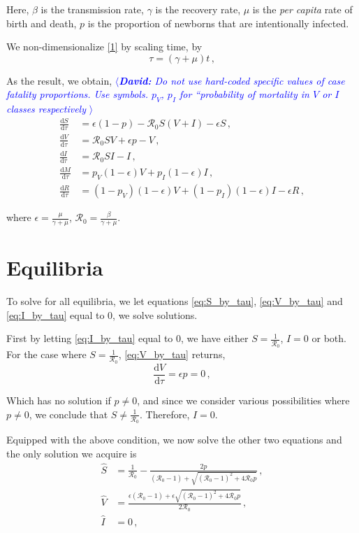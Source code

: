 \documentclass[12pt]{article}
\newcommand\dbyd[2]{\frac{\mathrm d{#1}}{\mathrm d{#2}}}
\newcommand{\R}{\mathcal{R}}
\newcommand{\david}[1]{\textcolor{blue}{$\langle${\slshape{\bfseries David:} #1 }$\rangle$}}
\newcommand{\pmV}{p_{V}}
\newcommand{\pmI}{p_{I}}
\begin{document}
Here, $\beta$ is the transmission rate, $\gamma$ is the recovery rate,
$\mu$ is the \emph{per capita} rate of birth and death, $p$ is the
proportion of newborns that are intentionally infected.

We non-dimensionalize \autoref{1} by scaling time, by
\begin{equation}
\tau=(\gamma+\mu)t \,,
\end{equation}

As the result, we obtain,
\david{Do not use hard-coded specific values of case fatality
  proportions.  Use symbols. $\pmV$, $\pmI$ for ``probability of
  mortality in $V$ or $I$ classes respectively}
\begin{subequations}\label{eq:base_ODE}
\begin{align}
\dbyd{S}{\tau}&=\epsilon(1-p)- \R_0 S(V+I)-\epsilon S\,, \label{eq:S_by_tau}\\
\dbyd{V}{\tau}&=\R_0 SV+\epsilon p-V\,, \label{eq:V_by_tau}\\
\dbyd{I}{\tau}&=\R_0 SI-I\,, \label{eq:I_by_tau}\\
\dbyd{M}{\tau}&=\pmV(1-\epsilon) V+\pmI(1-\epsilon) I\,,\\
\dbyd{R}{\tau}&=(1-\pmV)(1-\epsilon) V+(1-\pmI)(1-\epsilon) I-\epsilon R\,,
\end{align}
\end{subequations}

where $\epsilon=\frac{\mu}{\gamma+\mu}$, $\R_0=\frac{\beta}{\gamma+\mu}$.

\section{Equilibria}

To solve for all equilibria, we let equations \autoref{eq:S_by_tau}, \autoref{eq:V_by_tau} and \autoref{eq:I_by_tau} equal to 0, we solve solutions.

First by letting \autoref{eq:I_by_tau} equal to 0, we have either $S=\frac{1}{\R_0}$, $I=0$ or both. For the case where $S=\frac{1}{\R_0}$, \autoref{eq:V_by_tau} returns,
\begin{equation}
\dbyd{V}{\tau}=\epsilon p =0\,,
\end{equation}

Which has no solution if $p\neq 0$, and since we consider various possibilities where $p\neq 0$, we conclude that $S\neq\frac{1}{\R_0}$. Therefore, $I=0$.

Equipped with the above condition, we now solve the other two equations and the only solution we acquire is
\begin{subequations}
\begin{align}
\hat{S}&= \frac{1}{\R_0}-\frac{2p}{(\R_0 -1)+ \sqrt{(\R_0-1)^2+4\R_0
         p}}\,, \label{eq:Shat}\\
\hat{V}&= \frac{\epsilon(\R_0 -1)+ \epsilon \sqrt{(\R_0-1)^2+4\R_0 p}}{2\R_0}\,, \label{eq:Vhat}\\
\hat{I}&=0\,, \label{eq:Ihat}
\end{align}
\end{subequations}
\end{document}
